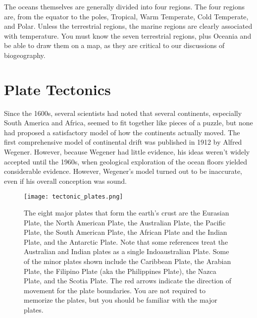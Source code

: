\documentclass[11pt, oneside]{article}   	%
\begin{document}
The oceans themselves are generally divided into four regions. The four regions are, from the equator to the poles, Tropical, Warm Temperate, Cold Temperate, and Polar. Unless the terrestrial regions, the marine regions are clearly associated with temperature.  You must know the seven terrestrial regions, plus Oceania and be able to draw them on a map, as they are critical to our discussions of biogeography.

\section{Plate Tectonics}

Since the 1600s, several scientists had noted that several continents, especially South America and Africa, seemed to fit together like pieces of a puzzle, but none had proposed a satisfactory model of how the continents actually moved. The first comprehensive model of continental drift was published in 1912 by Alfred Wegener. However, because Wegener had little evidence, his ideas weren't widely accepted until the 1960s, when geological exploration of the ocean floors yielded considerable evidence. However, Wegener's model turned out to be inaccurate, even if his overall conception was sound.

\begin{figure}[tb]
	\centering
		\texttt{[image: tectonic\_plates.png]}  
		\caption{The eight major plates that form the earth's crust are the Eurasian Plate, the North American Plate, the Australian Plate, the Pacific Plate, the South American Plate, the African Plate and the Indian Plate, and the Antarctic Plate. Note that some references treat the Australian and Indian plates as a single Indoaustralian Plate. Some of the minor plates shown include the Caribbean Plate, the Arabian Plate, the Filipino Plate (aka the Philippines Plate), the Nazca Plate, and the Scotia Plate. The red arrows indicate the direction of movement for the plate boundaries. You are not required to memorize the plates, but you should be familiar with the major plates.\label{tectonic plates}}
		
\end{figure}
\end{document}
